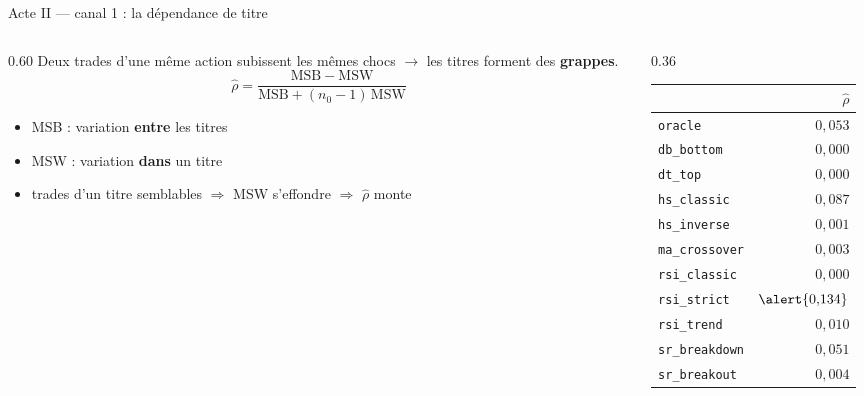 \documentclass[10pt]{beamer}
\begin{document}
\begin{frame}{Acte II --- canal 1 : la dépendance de titre}
  \begin{columns}[T]
    \begin{column}{0.60\textwidth}
      \small
      Deux trades d'une même action subissent les mêmes chocs
      $\to$ les titres forment des \textbf{grappes}.
      \[
        \hat\rho = \frac{\mathrm{MSB}-\mathrm{MSW}}
                        {\mathrm{MSB}+(n_0-1)\,\mathrm{MSW}}
      \]
      \begin{itemize}\setlength{\itemsep}{2.5mm}
        \item MSB : variation \textbf{entre} les titres
        \item MSW : variation \textbf{dans} un titre
        \item trades d'un titre semblables $\Rightarrow$ MSW s'effondre
          $\Rightarrow$ $\hat\rho$ monte
      \end{itemize}
    \end{column}
    \begin{column}{0.36\textwidth}
      \scriptsize
      \begin{tabular}{@{}lr@{}}
        \toprule
        & $\hat\rho$ \\
        \midrule
        \texttt{oracle}        & $0{,}053$ \\
        \midrule
        \texttt{db\_bottom}    & $0{,}000$ \\
        \texttt{dt\_top}       & $0{,}000$ \\
        \texttt{hs\_classic}   & $0{,}087$ \\
        \texttt{hs\_inverse}   & $0{,}001$ \\
        \texttt{ma\_crossover} & $0{,}003$ \\
        \texttt{rsi\_classic}  & $0{,}000$ \\
        \texttt{rsi\_strict}   & $\alert{0{,}134}$ \\
        \texttt{rsi\_trend}    & $0{,}010$ \\
        \texttt{sr\_breakdown} & $0{,}051$ \\
        \texttt{sr\_breakout}  & $0{,}004$ \\
        \bottomrule
      \end{tabular}
    \end{column}
  \end{columns}
\end{frame}
\end{document}
